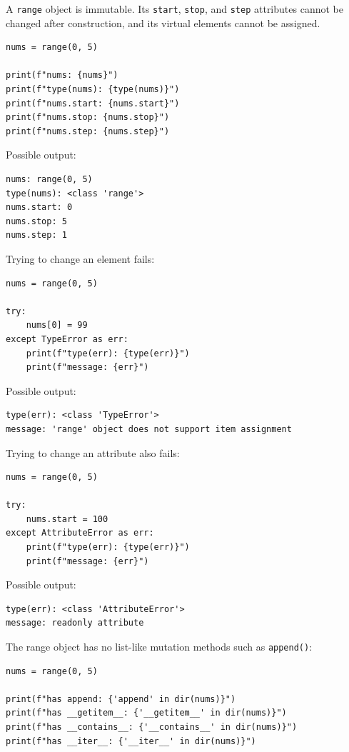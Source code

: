 A \texttt{range} object is immutable. Its \texttt{start}, \texttt{stop}, and \texttt{step} attributes cannot be changed after construction, and its virtual elements cannot be assigned.

\begin{verbatim}
nums = range(0, 5)

print(f"nums: {nums}")
print(f"type(nums): {type(nums)}")
print(f"nums.start: {nums.start}")
print(f"nums.stop: {nums.stop}")
print(f"nums.step: {nums.step}")
\end{verbatim}

Possible output:

\begin{verbatim}
nums: range(0, 5)
type(nums): <class 'range'>
nums.start: 0
nums.stop: 5
nums.step: 1
\end{verbatim}

Trying to change an element fails:

\begin{verbatim}
nums = range(0, 5)

try:
    nums[0] = 99
except TypeError as err:
    print(f"type(err): {type(err)}")
    print(f"message: {err}")
\end{verbatim}

Possible output:

\begin{verbatim}
type(err): <class 'TypeError'>
message: 'range' object does not support item assignment
\end{verbatim}

Trying to change an attribute also fails:

\begin{verbatim}
nums = range(0, 5)

try:
    nums.start = 100
except AttributeError as err:
    print(f"type(err): {type(err)}")
    print(f"message: {err}")
\end{verbatim}

Possible output:

\begin{verbatim}
type(err): <class 'AttributeError'>
message: readonly attribute
\end{verbatim}

The range object has no list-like mutation methods such as \texttt{append()}:

\begin{verbatim}
nums = range(0, 5)

print(f"has append: {'append' in dir(nums)}")
print(f"has __getitem__: {'__getitem__' in dir(nums)}")
print(f"has __contains__: {'__contains__' in dir(nums)}")
print(f"has __iter__: {'__iter__' in dir(nums)}")
\end{verbatim}

